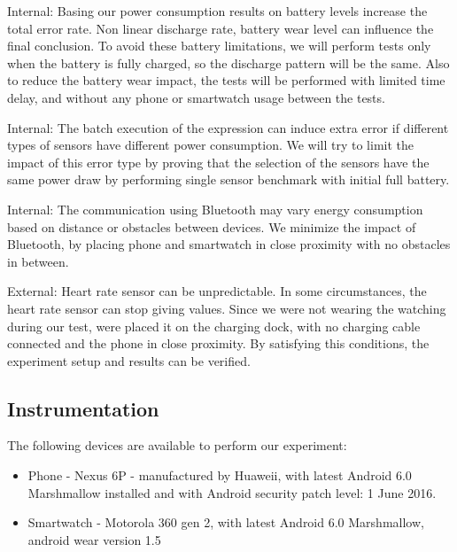 Internal: Basing our power consumption  results on battery levels increase the total error rate. Non linear discharge rate,
battery wear level\cite{battery_wear_proc} can influence the final conclusion. To avoid these battery limitations, we will perform tests only when the battery is fully charged, 
so the discharge pattern will be the same. Also to reduce the battery wear impact, the tests will be performed with limited time delay,
and without any phone or smartwatch usage between the tests.

 Internal: The batch execution of the expression can induce extra error if different types of sensors have different power consumption. 
 We will try to limit the impact of this error type by proving that the selection of the sensors have the same power draw by
 performing single sensor benchmark with initial full battery. 
 
 Internal: The communication using Bluetooth may vary energy consumption based on distance or obstacles between devices.
 We minimize the impact of Bluetooth, by placing phone and smartwatch in close proximity with no obstacles in between.
 
 External: Heart rate sensor can be unpredictable. In some circumstances, the heart rate sensor can stop giving values. 
 Since we were not wearing the watching during our test, were placed it on the charging dock, with no charging cable connected and the phone
 in close proximity. By satisfying this conditions, the experiment setup and results can be verified.
 
 \subsection{Instrumentation}
 The following devices are available to perform our experiment:
 \begin{itemize}
  \item Phone - Nexus 6P - manufactured by Huaweii,  with latest Android 6.0 Marshmallow installed and with Android security patch level: 1 June 2016. 
  \item Smartwatch - Motorola 360 gen 2, with latest Android 6.0 Marshmallow, android wear version 1.5 
 \end{itemize}

